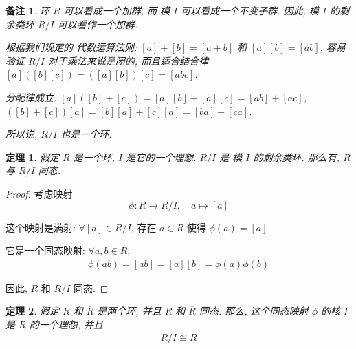 \documentclass[utf8]{ctexbook}
\newtheorem{theorem}{定理}[section]
\newtheorem{memo}{备注}[section]
\begin{document}
\begin{memo}
环 $R$ 可以看成一个加群, 而 模 $I$ 可以看成一个不变子群. 因此, 模 $I$ 的剩余类环 $R/I$ 可以看作一个加群. 

根据我们规定的 代数运算法则: $[a] +[b] = [a+b]$ 和 $[a][b] = [ab]$, 容易验证 $R/I$ 对于乘法来说是闭的, 而且适合结合律 $ [a]([b][c]) = ([a][b])[c] = [abc] $.

分配律成立: $ [a]([b]+[c]) = [a][b] + [a][c] = [ab] + [ac]$, $([b] + [c]) [a] = [b][a] + [c][a] = [ba] + [ca]$.

所以说, $R/I$ 也是一个环.
\end{memo}

\begin{theorem}\label{thm_ring_quotient_ring}
假定 $R$ 是一个环, $I$ 是它的一个理想. $R/I$ 是 模 $I$ 的剩余类环. 那么有, $R$ 与 $R/I$ 同态. 
\end{theorem}

\begin{proof}
考虑映射
\begin{equation}
\phi : R \longrightarrow R/I, \quad  a \mapsto [a]
\end{equation}

这个映射是满射: $\forall [a] \in R/I $, 存在 $a\in R$ 使得 $\phi(a) = [a]$.

它是一个同态映射: $\forall a, b \in R$,
\begin{align*}
\phi(ab) = [ab] = [a][b] = \phi(a) \phi(b)
\end{align*}

因此, $R$ 和 $R/I$ 同态.

\end{proof}

\begin{theorem}\label{thm_ring_iso_quotient_ring}
假定 $R$ 和 $\overline{R}$ 是两个环, 并且 $R$ 和 $\overline{R}$ 同态. 那么, 这个同态映射 $\phi$ 的核 $I$ 是 $R$ 的一个理想, 并且
\begin{equation}
R/I \cong \overline{R}
\end{equation}
\end{theorem}
\end{document}
